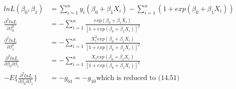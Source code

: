 \documentclass{article}\usepackage[]{graphicx}\usepackage[]{color}
\begin{document}
\begin{displaymath}
\begin{split}
  lnL(\beta_0, \beta_1) &= \sum_{i=1}^n y_i(\beta_0+\beta_1 X_i) - \sum_{i=1}^n(1+exp(\beta_0+\beta_1 X_i))\\
  \frac{\partial^2 lnL}{\partial \beta_0^2} &= - \sum_{i=1}^n \frac{exp(\beta_0+\beta_1 X_i)}{[1+exp(\beta_0+\beta_1 X_i)]^2}\\
  \frac{\partial^2 lnL}{\partial \beta_1^2} &= - \sum_{i=1}^n \frac{X_i^2 exp(\beta_0+\beta_1 X_i)}{[1+exp(\beta_0+\beta_1 X_i)]^2}\\
  \frac{\partial^2 lnL}{\partial \beta_0 \partial \beta_1} &= - \sum_{i=1}^n \frac{X_i exp(\beta_0+\beta_1 X_i)}{[1+exp(\beta_0+\beta_1 X_i)]^2}\\
  -E\{ \frac{\partial^2 lnL}{\partial \beta_0 \partial \beta_1} \} &= -g_{01} = -g_{10}
  \text{which is reduced to (14.51)}
\end{split}
\end{displaymath}
\end{document}
